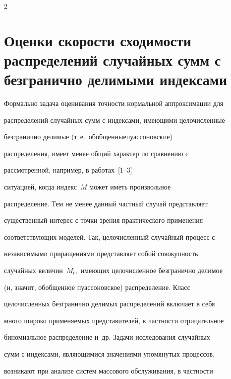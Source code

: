       \begin{multicols}{2}





      \label{st\stat}














\section{Оценки скорости сходимости распределений случайных сумм с безгранично делимыми индексами}





Формально задача оценивания точности нормальной аппроксимации для


распределений случайных сумм с индексами, имеющими це\-ло\-чис\-ленные


безгранично делимые (т.\,е.\ обобщенные\linebreak пуассоновские)


распределения, имеет менее общий характер по сравнению с


рассмотренной, например, в работах~[1--3]


ситуацией, когда индекс~$M$ может иметь произвольное


распределение. Тем не менее данный частный случай представляет


существенный интерес с точки зрения практического применения


соответствующих моделей. Так, целочисленный случайный процесс с


независимыми приращениями представляет собой совокупность


случайных величин~$M_t,$ имеющих целочисленное безгранично делимое


(и, значит, обобщенное пуассоновское) распределение. Класс


целочисленных безгранично делимых распределений включает в себя


много широко применяемых представителей, в частности отрицательное


биномиальное распределение и~др. Задачи исследования случайных


сумм с индексами, являющимися значениями упомянутых процессов,


возникают при анализе систем массового обслуживания, в частности



\end{multicols}
